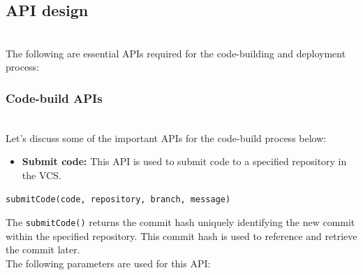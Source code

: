\subsection{API design}\label{qPZaz-Fdw6nmvE7GVJNP1}
\\
The following are essential APIs required for the code-building and deployment process:

\subsubsection{Code-build APIs}\label{tu2Y_kDFm8OFpRfTFVdIy}
\\
Let's discuss some of the important APIs for the code-build process below:

\begin{itemize}
\item
\protect{}\label{H99SgjZd7sTBdAZhFfOKq}
\textbf{Submit code:} This API is used to submit code to a specified repository in the VCS.
\end{itemize}

\begin{lstlisting}[language=c++17]
submitCode(code, repository, branch, message)
\end{lstlisting}

The \texttt{submitCode()} returns the commit hash uniquely identifying the new commit within the specified repository. This commit hash is used to reference and retrieve the commit later.\\
The following parameters are used for this API:

\begin{table}[htbp]
\centering
\small
{}
\end{table}

